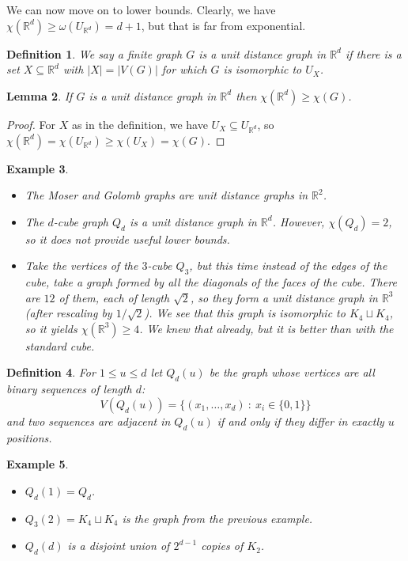 \documentclass[a4paper]{article}
\theoremstyle{plain}
\newtheorem{lemma}{Lemma}
\newtheorem{definition}[lemma]{Definition}
\theoremstyle{myremark}
\newtheorem{example}[lemma]{Example}
\newcommand{\RR}{\mathbb{R}}
\begin{document}
We can now move on to lower bounds. Clearly, we have $\chi(\RR^d)\geq \omega(U_{\RR^d})=d+1$, but that is far from exponential. 

\begin{definition}
We say a finite graph $G$ is a \emph{unit distance graph in $\RR^d$} if there is a set $X\subseteq \RR^d$  with $|X|=|V(G)|$ for which $G$ is isomorphic to $U_X$.
\end{definition}

\begin{lemma}
If $G$ is a unit distance graph in $\RR^d$ then $\chi(\RR^d)\geq \chi(G)$.
\end{lemma}
\begin{proof} For $X$ as in the definition, we have
$U_X\subseteq U_{\RR^d}$, so $\chi(\RR^d)=\chi(U_{\RR^d})\geq \chi(U_X)=\chi(G)$.
\end{proof}

\begin{example}
\begin{itemize}
\item The Moser and Golomb graphs are unit distance graphs in $\RR^2$.
\item The $d$-cube graph $Q_d$ is a unit distance graph in $\RR^d$. However, $\chi(Q_d)=2$, so it does not provide useful lower bounds.
\item Take the vertices of the $3$-cube $Q_3$, but this time instead of the edges of the cube, take a graph formed by all the diagonals of the faces of the cube. There are $12$ of them, each of length $\sqrt{2}$, so they form a unit distance graph in $\RR^3$ (after rescaling by $1/\sqrt{2}$). We see that this graph  is isomorphic to $K_4\sqcup K_4$, so it yields $\chi(\RR^3)\geq 4$. We knew that already, but it is better than with the standard cube.
\end{itemize}
\end{example}

\begin{definition}
For $1\leq u\leq d$ let $Q_d(u)$ be the graph whose vertices are all binary sequences of length $d$:
$$V(Q_d(u))=\{(x_1,\ldots,x_d)~:~x_i\in\{0,1\}\}$$
and two sequences are adjacent in $Q_d(u)$ if and only if they differ in exactly $u$ positions.
\end{definition}
\begin{example}
\begin{itemize}
\item $Q_d(1)=Q_d$.
\item $Q_3(2)=K_4\sqcup K_4$ is the graph from the previous example.
\item $Q_d(d)$ is a disjoint union of $2^{d-1}$ copies of $K_2$.
\end{itemize}
\end{example}
\end{document}
